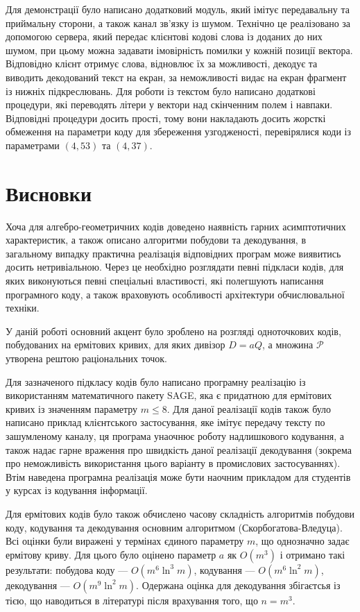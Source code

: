 \documentclass[a4paper,14pt,oneside]{extarticle}
\begin{document}
Для демонстрації було написано додатковий модуль, який імітує передавальну та приймальну сторони, а також канал зв'язку із шумом. Технічно це 
реалізовано за допомогою сервера, який передає клієнтові кодові слова із доданих до них шумом, при цьому можна задавати імовірність помилки у 
кожній позиції вектора. Відповідно клієнт отримує слова, відновлює їх за можливості, декодує та виводить декодований текст на екран, 
за неможливості видає на екран фрагмент із нижніх підкреслювань. Для роботи із текстом було написано додаткові процедури, які переводять літери у 
вектори над скінченним полем і навпаки. Відповідні процедури досить прості, тому вони накладають досить жорсткі обмеження на параметри коду для 
збереження узгодженості, перевірялися коди із параметрами $(4, 53)$ та $(4, 37)$.

\pagebreak
\section*{Висновки}
Хоча для алгебро-геометричних кодів доведено наявність гарних асимптотичних характеристик, а також описано алгоритми побудови та декодування,
в загальному випадку практична реалізація відповідних програм може виявитись досить нетривіальною. Через це необхідно розглядати певні підкласи 
кодів, для яких виконуються певні спеціальні властивості, які полегшують написання програмного коду, а також враховують особливості архітектури 
обчислювальної техніки.

У даній роботі основний акцент було зроблено на розгляді одноточкових кодів, побудованих на ермітових кривих, для яких дивізор $D=aQ$, а 
множина $\mathcal{P}$ утворена рештою раціональних точок.

Для зазначеного підкласу кодів було написано програмну реалізацію із використанням математичного пакету SAGE, яка є придатною для ермітових кривих із значенням 
параметру $m \le 8$. Для даної реалізації кодів також було написано приклад клієнтського застосування, яке імітує передачу тексту по зашумленому каналу, ця 
програма унаочнює роботу надлишкового кодування, а також надає гарне враження про швидкість даної реалізації декодування (зокрема про неможливість використання 
цього варіанту в промислових застосуваннях). Втім наведена програмна реалізація може бути наочним прикладом для студентів у курсах із кодування інформації.

Для ермітових кодів було також обчислено часову складність алгоритмів побудови коду, кодування та декодування основним алгоритмом (Скорбогатова-Вледуца). 
Всі оцінки були виражені у термінах єдиного параметру $m$, що однозначно задає ермітову криву. Для цього було оцінено параметр $a$ як $O(m^3)$ і отримано 
такі результати: побудова коду --- $O(m^6 \ln^3 m)$, кодування --- $O(m^6 \ln^2 m)$, декодування --- $O(m^9 \ln^2 m)$. Одержана оцінка для декодування 
збігаєтсья із тією, що наводиться в літературі після врахування того, що $n=m^3$.
\end{document}
